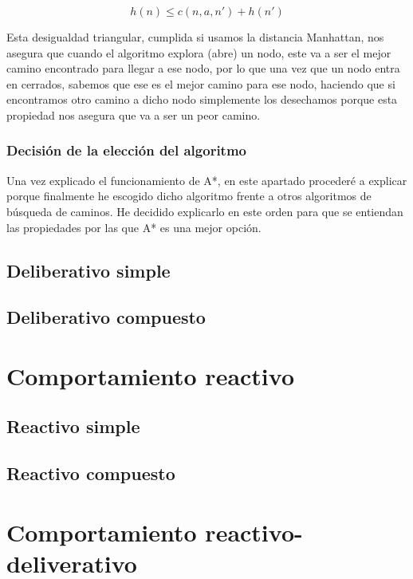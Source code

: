 \documentclass[10pt, spanish]{article}
\begin{document}
$$ h(n) \leq c(n, a, n') + h(n') $$

Esta desigualdad triangular, cumplida si usamos la distancia Manhattan, nos asegura que cuando el algoritmo explora (abre) un nodo, este va a ser el mejor camino encontrado para llegar a ese nodo, por lo que una vez que un nodo entra en cerrados, sabemos que ese es el mejor camino para ese nodo, haciendo que si encontramos otro camino a dicho nodo simplemente los desechamos porque esta propiedad nos asegura que va a ser un peor camino.


\subsubsection{Decisión de la elección del algoritmo}

Una vez explicado el funcionamiento de A*, en este apartado procederé a explicar porque finalmente he escogido dicho algoritmo frente a otros algoritmos de búsqueda de caminos. He decidido explicarlo en este orden para que se entiendan las propiedades por las que A* es una mejor opción.



\subsection{Deliberativo simple}

\subsection{Deliberativo compuesto}

\section{Comportamiento reactivo}

\subsection{Reactivo simple}

\subsection{Reactivo compuesto}

\section{Comportamiento reactivo-deliverativo}
\end{document}
